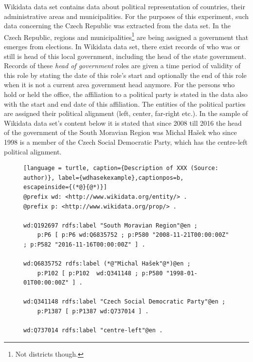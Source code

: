 Wikidata data set contains data about political representation of countries, their administrative areas and municipalities. For the purposes of this experiment, such data concerning the Czech Republic was extracted from the data set. In the Czech Republic, regions and municipalities\footnote{Not districts though.} are being assigned a government that emerges from elections. In Wikidata data set, there exist records of who was or still is head of this local government, including the head of the state government. Records of these \textit{head of government} roles are given a time period of validity of this role by stating the date of this role's start and optionally the end of this role when it is not a current area government head anymore. For the persons who hold or held the office, the affiliation to a political party is stated in the data also with the start and end date of this affiliation. The entities of the political parties are assigned their political alignment (left, center, far-right etc.). In the sample of Wikidata data set's content below it is stated that since 2008 till 2016 the head of the government of the South Moravian Region was Michal Hašek who since 1998 is a member of the Czech Social Democratic Party, which has the centre-left political alignment.

\begin{figure}[h]
\begin{lstlisting}[language = turtle, caption={Description of XXX (Source: author)}, label={wdhasekexample},captionpos=b, escapeinside={(*@}{@*)}]
@prefix wd: <http://www.wikidata.org/entity/> .
@prefix p: <http://www.wikidata.org/prop/> .

wd:Q192697 rdfs:label "South Moravian Region"@en ;
    p:P6 [ p:P6 wd:Q6835752 ; p:P580 "2008-11-21T00:00:00Z" ; p:P582 "2016-11-16T00:00:00Z" ] .

wd:Q6835752 rdfs:label (*@"Michal Hašek"@*)@en ;
    p:P102 [ p:P102  wd:Q341148 ; p:P580 "1998-01-01T00:00:00Z" ] .

wd:Q341148 rdfs:label "Czech Social Democratic Party"@en ;
    p:P1387 [ p:P1387 wd:Q737014 ] .

wd:Q737014 rdfs:label "centre-left"@en .
\end{lstlisting}
\end{figure}

